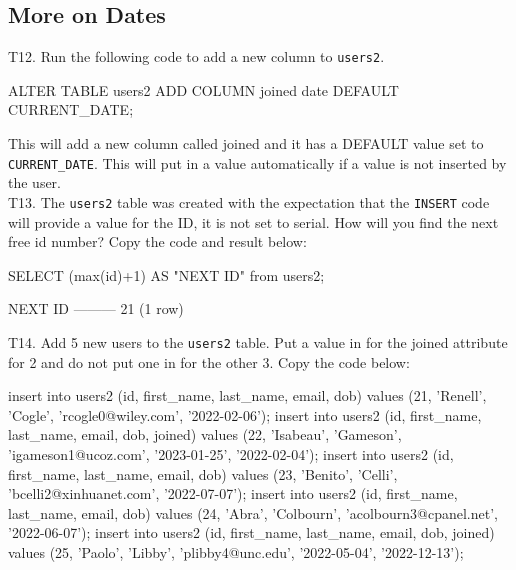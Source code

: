 \subsection*{More on Dates}
T12. Run the following code to add a new column to \verb|users2|.
\begin{sql}
ALTER TABLE users2 ADD COLUMN joined date DEFAULT CURRENT_DATE;
\end{sql}
This will add a new column called joined and it has a DEFAULT value set to \verb|CURRENT_DATE|. This will put in a value automatically if a value is not inserted by the user.\\

T13. The \verb|users2|  table was created with the expectation that the \verb|INSERT| code will provide a value for the ID, it is not set to serial. How will you find the next free id number? Copy the code and result below:
\begin{sql}
SELECT (max(id)+1) AS "NEXT ID" from users2;
\end{sql}
\begin{pseudo}
 NEXT ID
---------
      21
(1 row)
\end{pseudo}

T14. Add 5 new users to the \verb|users2| table. Put a value in for the joined attribute for 2 and do not put one in for the other 3. Copy the code below:

\begin{sql}
insert into users2 (id, first_name, last_name, email, dob) values (21, 'Renell', 'Cogle', 'rcogle0@wiley.com', '2022-02-06');
insert into users2 (id, first_name, last_name, email, dob, joined) values (22, 'Isabeau', 'Gameson', 'igameson1@ucoz.com', '2023-01-25', '2022-02-04');
insert into users2 (id, first_name, last_name, email, dob) values (23, 'Benito', 'Celli', 'bcelli2@xinhuanet.com', '2022-07-07');
insert into users2 (id, first_name, last_name, email, dob) values (24, 'Abra', 'Colbourn', 'acolbourn3@cpanel.net', '2022-06-07');
insert into users2 (id, first_name, last_name, email, dob, joined) values (25, 'Paolo', 'Libby', 'plibby4@unc.edu', '2022-05-04', '2022-12-13');
\end{sql}

